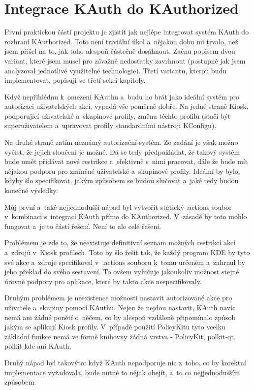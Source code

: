 {\chapter{Integrace KAuth do KAuthorized}
První praktickou částí projektu je zjistit jak nejlépe integrovat systém KAuth do rozhraní KAuthorized. Toto není triviální úkol a~nějakou dobu mi trvalo, než jsem přišel na to, jak toho alespoň částečně dosáhnout. Začnu popisem dvou variant, které jsem musel pro závažné nedostatky zavrhnout (postupně jak jsem analyzoval jednotlivé  využitelné technologie). Třetí variantu, kterou budu implementovat, popisuji ve třetí sekci kapitoly.

Když nepřihlédnu k~omezení KAuthu a~budu ho brát jako ideální systém pro autorizaci uživatelských akcí, vypadá vše poměrně dobře. Na jedné straně Kiosk, podporující uživatelské a~skupinové profily, změnu těchto profilů (stačí být superuživatelem a~upravovat profily standardními nástroji KConfigu).

Na druhé straně zatím neznámý autorizační systém. Ze zadání je však možno vyčíst, že jejich sloučení je možné. Dá se tedy předpokládat, že takový systém bude umět přidávat nové restrikce a~efektivně s~nimi pracovat, dále že bude mít nějakou podporu pro zmíněné uživatelské a~skupinové profily. Ideální by bylo, kdyby šlo specifikovat, jakým způsobem se budou slučovat a~jaké tedy budou konečné výsledky.

Můj první a~také nejjednodušší nápad byl vytvořit statický .actions soubor v~kombinaci s~integrací KAuth přímo do KAuthorized. V~zásadě by toto mohlo fungovat a~je to částí řešení. Není to ale celé řešení.

Problémem je zde to, že neexistuje definitivní seznam možných restrikcí akcí a~zdrojů v~Kiosk profilech. Toto by šlo řešit tak, že každý program KDE by tyto své akce a~zdroje specifikoval v~.actions souboru k~tomu určeném a~zahrnul by jeho překlad do svého sestavení. To ovšem vylučuje jakoukoliv možnost stejné úrovně podpory pro aplikace, které by takto akce nespecifikovaly.

Druhým problémem je neexistence možnosti nastavit autorizované akce pro uživatele a~skupiny pomocí KAuthu. Nejen že nejdou nastavit, KAuth navíc nemá ani žádné ponětí o~něčem, co by alespoň vzdáleně připomínalo způsob jakým se aplikují Kiosk profily. V~případě použití PolicyKitu tyto vcelku základní funkce nemá ve formě knihovny žádná vrstva - PolicyKit, polkit-qt, polkit-kde ani KAuth.

Druhý nápad byl takovýto: když KAuth nepodporuje nic z~toho, co by korektní implementace vyžadovala, bude nutné to nějak obejít, a~to co nejjednodušším způsobem.

}
